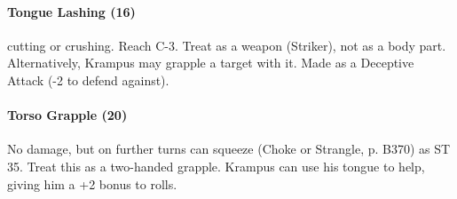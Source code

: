 \paragraph{Tongue Lashing (16)}  cutting or crushing. Reach C-3. Treat as a weapon (Striker), not as a body part. Alternatively, Krampus may grapple a target with it. Made as a Deceptive Attack (-2 to defend against).

\paragraph{Torso Grapple (20)} No damage, but on further turns can squeeze (Choke or Strangle, p. B370) as ST 35. Treat this as a two-handed grapple. Krampus can use his tongue to help, giving him a +2 bonus to rolls.
